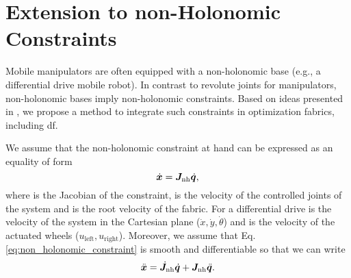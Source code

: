 \section{Extension to non-Holonomic Constraints}%
\label{sec:non_holonomic_constraints}
%
Mobile manipulators are often equipped with a non\hyp{}holonomic base (e.g., a
differential drive mobile robot). In contrast to revolute joints for
manipulators, non\hyp{}holonomic bases imply non\hyp{}holonomic constraints. Based on
ideas presented in \cite{Meng2019}, we propose a method to integrate such
constraints in optimization fabrics, including \ac{df}.

We assume that the non\hyp{}holonomic constraint at hand can be expressed as an
equality of form
\begin{equation}
  \dot{\bm{x}} = \bm{J}_{\textrm{nh}}\dot{\bm{q}},
  \label{eq:non_holonomic_constraint}
\end{equation}
where \Jnh{} is the Jacobian of the constraint, \qdot{} is
the velocity of the controlled joints of the system and \xdot{} is the root velocity of
the fabric. For a differential drive \xdot{} is the velocity of the system in the
Cartesian plane ($\dot{x}, \dot{y}, \dot{\theta}$) and \qdot{} is the velocity of the
actuated wheels ($u_{\textrm{left}}, u_{\textrm{right}}$). Moreover, we assume that Eq.
\ref{eq:non_holonomic_constraint} is smooth and differentiable so that we can write 
\begin{equation}
  \ddot{\bm{x}} = \dot{\bm{J}}_{\textrm{nh}}\dot{\bm{q}} + \bm{J}_{\textrm{nh}}\ddot{\bm{q}}.
  \label{eq:non_holonomic_constraint_derived}
\end{equation}

